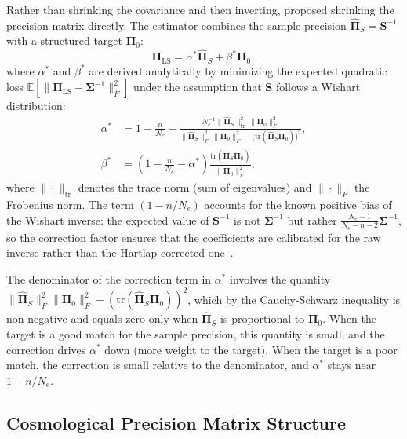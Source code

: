 Rather than shrinking the covariance and then inverting, \citep{bodnar2016direct} proposed shrinking the precision matrix directly. The estimator combines the sample precision $\hat{\boldsymbol{\Pi}}_S = \mathbf{S}^{-1}$ with a structured target $\boldsymbol{\Pi}_0$:
\begin{equation}
\label{eq:direct_precision}
\boldsymbol{\Pi}_{\text{LS}} = \alpha^* \hat{\boldsymbol{\Pi}}_S + \beta^* \boldsymbol{\Pi}_0,
\end{equation}
where $\alpha^*$ and $\beta^*$ are derived analytically by minimizing the expected quadratic loss $\mathbb{E}[\|\boldsymbol{\Pi}_{\text{LS}} - \boldsymbol{\Sigma}^{-1}\|_F^2]$ under the assumption that $\mathbf{S}$ follows a Wishart distribution:
\begin{align}
\label{eq:alpha_star}
\alpha^* &= 1 - \frac{n}{N_e} - \frac{N_e^{-1} \|\hat{\boldsymbol{\Pi}}_S\|_{\text{tr}}^2 \, \|\boldsymbol{\Pi}_0\|_F^2}{\|\hat{\boldsymbol{\Pi}}_S\|_F^2 \, \|\boldsymbol{\Pi}_0\|_F^2 - \bigl(\text{tr}(\hat{\boldsymbol{\Pi}}_S \boldsymbol{\Pi}_0)\bigr)^2}, \\
\label{eq:beta_star}
\beta^* &= \left(1 - \frac{n}{N_e} - \alpha^*\right) \frac{\text{tr}(\hat{\boldsymbol{\Pi}}_S \boldsymbol{\Pi}_0)}{\|\boldsymbol{\Pi}_0\|_F^2},
\end{align}
where $\|\cdot\|_{\text{tr}}$ denotes the trace norm (sum of eigenvalues) and $\|\cdot\|_F$ the Frobenius norm. The term $(1 - n/N_e)$ accounts for the known positive bias of the Wishart inverse: the expected value of $\mathbf{S}^{-1}$ is not $\boldsymbol{\Sigma}^{-1}$ but rather $\frac{N_e - 1}{N_e - n - 2}\boldsymbol{\Sigma}^{-1}$, so the correction factor ensures that the coefficients are calibrated for the raw inverse rather than the Hartlap-corrected one~\citep{hartlap2007your}.

The denominator of the correction term in $\alpha^*$ involves the quantity $\|\hat{\boldsymbol{\Pi}}_S\|_F^2 \|\boldsymbol{\Pi}_0\|_F^2 - (\text{tr}(\hat{\boldsymbol{\Pi}}_S \boldsymbol{\Pi}_0))^2$, which by the Cauchy-Schwarz inequality is non-negative and equals zero only when $\hat{\boldsymbol{\Pi}}_S$ is proportional to $\boldsymbol{\Pi}_0$. When the target is a good match for the sample precision, this quantity is small, and the correction drives $\alpha^*$ down (more weight to the target). When the target is a poor match, the correction is small relative to the denominator, and $\alpha^*$ stays near $1 - n/N_e$.

\subsection{Cosmological Precision Matrix Structure}
\label{sec:cosmo_cov}

